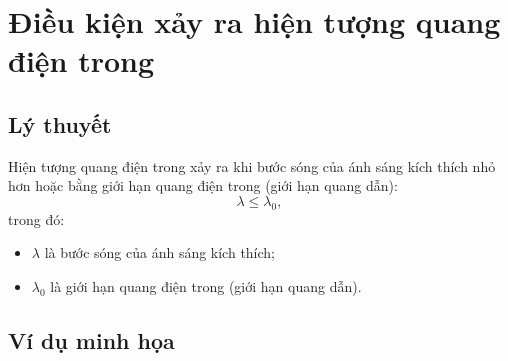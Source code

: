 
\chapter[Điều kiện xảy ra hiện tượng \\quang điện trong]{Điều kiện xảy ra hiện tượng quang điện trong}
\section{Lý thuyết}
Hiện tượng quang điện trong xảy ra khi bước sóng của ánh sáng kích thích nhỏ hơn hoặc bằng giới hạn quang điện trong (giới hạn quang dẫn):
\begin{equation}
	\lambda \leq \lambda_0,
\end{equation}
trong đó:
\begin{itemize}
	\item $\lambda$ là bước sóng của ánh sáng kích thích;
	\item $\lambda_0$ là giới hạn quang điện trong (giới hạn quang dẫn).
\end{itemize}

\section{Ví dụ minh họa}



